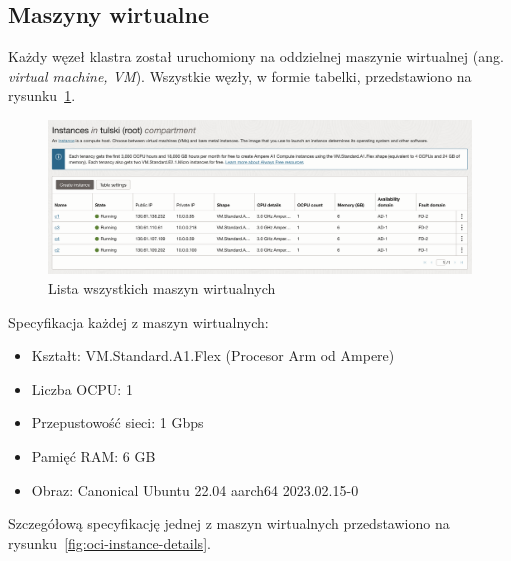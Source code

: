 \subsection{Maszyny wirtualne}

Każdy węzeł klastra został uruchomiony na oddzielnej maszynie wirtualnej (ang. \emph{virtual machine, VM}).
Wszystkie węzły, w formie tabelki, przedstawiono na rysunku~\ref{fig:oci-compute-instances}.

\begin{figure}[H]
    \centering
    \includegraphics[width=\textwidth]{img/oci-compute-instances}
    \caption{Lista wszystkich maszyn wirtualnych}
    \label{fig:oci-compute-instances}
\end{figure}

\noindent Specyfikacja każdej z maszyn wirtualnych:
\begin{itemize}
    \item Kształt: VM.Standard.A1.Flex (Procesor Arm od Ampere)
    \item Liczba OCPU: 1
    \item Przepustowość sieci: 1 Gbps
    \item Pamięć RAM: 6 GB
    \item Obraz: Canonical Ubuntu 22.04 aarch64 2023.02.15-0
\end{itemize}

\noindent Szczegółową specyfikację jednej z maszyn wirtualnych przedstawiono na rysunku~\ref{fig:oci-instance-details}.

